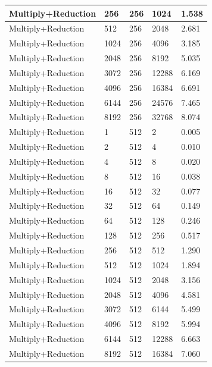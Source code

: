 \documentclass{article}
\begin{document}
\begin{longtable}{|l|l|l|l|l|}
Multiply+Reduction & 256  & 256         & 1024              & 1.538             \\ \hline
Multiply+Reduction & 512  & 256         & 2048              & 2.681             \\ \hline
Multiply+Reduction & 1024 & 256         & 4096              & 3.185             \\ \hline
Multiply+Reduction & 2048 & 256         & 8192              & 5.035             \\ \hline
Multiply+Reduction & 3072 & 256         & 12288             & 6.169             \\ \hline
Multiply+Reduction & 4096 & 256         & 16384             & 6.691             \\ \hline
Multiply+Reduction & 6144 & 256         & 24576             & 7.465             \\ \hline
Multiply+Reduction & 8192 & 256         & 32768             & 8.074             \\ \hline
Multiply+Reduction & 1    & 512         & 2                 & 0.005             \\ \hline
Multiply+Reduction & 2    & 512         & 4                 & 0.010             \\ \hline
Multiply+Reduction & 4    & 512         & 8                 & 0.020             \\ \hline
Multiply+Reduction & 8    & 512         & 16                & 0.038             \\ \hline
Multiply+Reduction & 16   & 512         & 32                & 0.077             \\ \hline
Multiply+Reduction & 32   & 512         & 64                & 0.149             \\ \hline
Multiply+Reduction & 64   & 512         & 128               & 0.246             \\ \hline
Multiply+Reduction & 128  & 512         & 256               & 0.517             \\ \hline
Multiply+Reduction & 256  & 512         & 512               & 1.290             \\ \hline
Multiply+Reduction & 512  & 512         & 1024              & 1.894             \\ \hline
Multiply+Reduction & 1024 & 512         & 2048              & 3.156             \\ \hline
Multiply+Reduction & 2048 & 512         & 4096              & 4.581             \\ \hline
Multiply+Reduction & 3072 & 512         & 6144              & 5.499             \\ \hline
Multiply+Reduction & 4096 & 512         & 8192              & 5.994             \\ \hline
Multiply+Reduction & 6144 & 512         & 12288             & 6.663             \\ \hline
Multiply+Reduction & 8192 & 512         & 16384             & 7.060             \\ \hline
\end{longtable}
\end{document}
